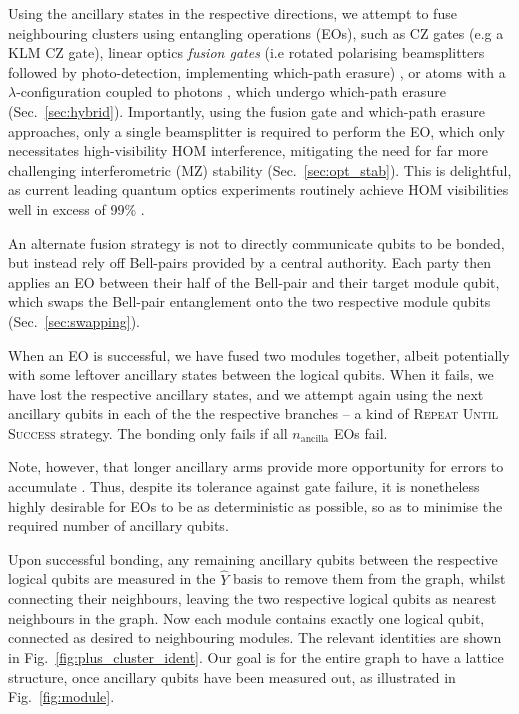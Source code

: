 \documentclass[aps, rmp, twocolumn, amsmath, amssymb, nofootinbib, superscriptaddress, longbibliography, floatfix, table-of-contents, eqsecnum]{revtex4-1}
\begin{document}
Using the ancillary states in the respective directions, we attempt to fuse neighbouring clusters using entangling operations (EOs), such as CZ gates (e.g a KLM CZ gate), linear optics \textit{fusion gates} (i.e rotated polarising beamsplitters followed by photo-detection, implementing which-path erasure) \cite{bib:BrowneRudolph05}, or atoms with a $\lambda$-configuration coupled to photons \cite{bib:BarrettKok05}, which undergo which-path erasure (Sec.~\ref{sec:hybrid}). Importantly, using the fusion gate and which-path erasure approaches, only a single beamsplitter is required to perform the EO, which only necessitates high-visibility HOM interference, mitigating the need for far more challenging interferometric (MZ) stability (Sec.~\ref{sec:opt_stab}). This is delightful, as current leading quantum optics experiments routinely achieve HOM visibilities well in excess of 99\% \cite{???}.

An alternate fusion strategy is not to directly communicate qubits to be bonded, but instead rely off Bell-pairs provided by a central authority. Each party then applies an EO between their half of the Bell-pair and their target module qubit, which swaps the Bell-pair entanglement onto the two respective module qubits (Sec.~\ref{sec:swapping}).

When an EO is successful, we have fused two modules together, albeit potentially with some leftover ancillary states between the logical qubits. When it fails, we have lost the respective ancillary states, and we attempt again using the next ancillary qubits in each of the the respective branches -- a kind of \textsc{Repeat Until Success} strategy. The bonding only fails if all $n_\text{ancilla}$ EOs fail.

Note, however, that longer ancillary arms provide more opportunity for errors to accumulate \cite{bib:RohdeRalphMunro07}. Thus, despite its tolerance against gate failure, it is nonetheless highly desirable for EOs to be as deterministic as possible, so as to minimise the required number of ancillary qubits.

Upon successful bonding, any remaining ancillary qubits between the respective logical qubits are measured in the $\hat{Y}$ basis to remove them from the graph, whilst connecting their neighbours, leaving the two respective logical qubits as nearest neighbours in the graph. Now each module contains exactly one logical qubit, connected as desired to neighbouring modules. The relevant identities are shown in Fig.~\ref{fig:plus_cluster_ident}. Our goal is for the entire graph to have a lattice structure, once ancillary qubits have been measured out, as illustrated in Fig.~\ref{fig:module}.
\end{document}
